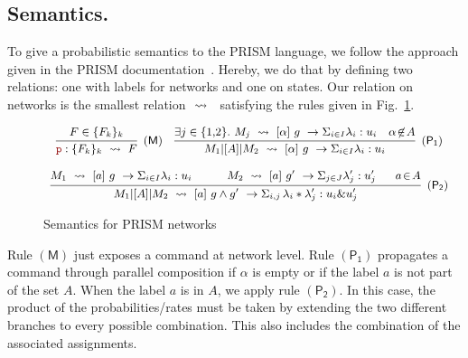 \subsection{Semantics.} To give a probabilistic semantics to the PRISM
language, we follow the approach given in the PRISM
documentation~\cite{PRISMdoc}.  Hereby, we do that by defining two
relations: one with labels for networks and one on states. Our
relation on networks is the smallest relation $\ \stackrel{}{\rightsquigarrow}\ {}$
satisfying the rules given in Fig.~\ref{fig:semantics}.
% 
\begin{figure}[h]
  \begin{displaymath}\small
    \begin{array}{ccc}
      \infer[\mathsf{(M)}]
      { {\role{p}:\{F_k\}_k} \prismred{} F
      }
      {
      F\in\{F_k\}_k
      }
      \quad
      \infer[\mathsf{(P_1)}]
      {M_1\ppp A M_2\prismred{}\command {\alpha}g\lambda u
      }
      {
      \exists j\in\{1,\!2\}.\ 
      M_j\prismred{} \command {\alpha}g\lambda u
      & \alpha\!\not\in\! A
        }
      \\\\
      \infer[\mathsf{(P_2)}]
      {M_1\ppp A M_2\prismred{}
      \commandBase a{g\land g'}
      {\Sigma_{i,j}\,\lambda_i*\lambda'_j}: {u_i\& u'_j} 
      }
      {
      M_1\prismred{}\command {a}g\lambda u
      \quad&\quad 
        M_2\prismred{}\commandBase {a} {g'} \Sigma_{j\in J}\lambda'_j: u'_j
      \ &\
             a\!\in\! A}
    \end{array}
  \end{displaymath}
  \caption{Semantics for PRISM networks} 
  \label{fig:semantics}
\end{figure}
Rule $\mathsf{(M)}$ just exposes a command at network level. Rule
$\mathsf{(P_1)}$ propagates a command through parallel composition if
$\alpha$ is empty or if the label $a$ is not part of the set $A$. When
the label $a$ is in $A$, we apply rule $\mathsf{(P_2)}$. In this case,
the product of the probabilities/rates must be taken by extending the
two different branches to every possible combination. This also
includes the combination of the associated assignments.

